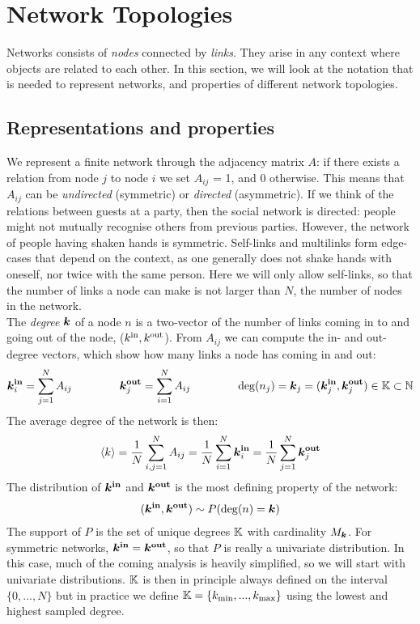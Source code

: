 \newpage
\section{\theory Network Topologies} \label{sec:NetworkTopologies}

Networks consists of \textsl{nodes} connected by \textsl{links}. They arise in any context where objects are related to each other. In this section, we will look at the notation that is needed to represent networks, and properties of different network topologies.

\subsection{Representations and properties}
We represent a finite network through the adjacency matrix $A$: if there exists a relation from node $j$ to node $i$ we set $A_{ij} $ = 1, and 0 otherwise. This means that $A_{ij}$ can be \textsl{undirected} (symmetric) or \textsl{directed} (asymmetric). If we think of the relations between guests at a party, then the social network is directed: people might not mutually recognise others from previous parties. However, the network of people having shaken hands is symmetric. Self-links and multilinks form edge-cases that depend on the context, as one generally does not shake hands with oneself, nor twice with the same person. Here we will only allow self-links, so that the number of links a node can make is not larger than $N$, the number of nodes in the network.\\

The \textsl{degree} ${\boldsymbol{k}}$ of a node $n$  is a two-vector of the number of links coming in to and going out of the node, (${k^{\rm in}}, {k^{\rm out}}$). From $A_{ij}$ we can compute the in- and out-degree vectors, which show how many links a node has coming in and out:
\begin{align}
\kinbi = \sum_{j=1}^{N} A_{i j} \hspace{15mm} \koutbj = \sum_{i=1}^{N} A_{i j}  \hspace{15mm} \degree(n_j) = \k_j = (\boldsymbol{k}_j^{\bf in}, \koutbj) \in \K \subset \mathbb{N} \label{eq:definekinkoutfromA} 
\end{align}
The average degree of the network is then: 
\begin{align}
{\langle k\rangle} = \frac{1}{N} \sum_{i,j=1}^{N} A_{ij} = \frac{1}{N} \sum_{i=1}^{N} {\boldsymbol{k}_i^{\bf in}} = \frac{1}{N} \sum_{j=1}^{N} {\boldsymbol{k}_j^{\bf out}} \label{eq:kmean} 
\end{align}
The distribution of ${\boldsymbol{k^{\rm in}}}$ and $\boldsymbol{{k^{\rm out}}}$ is the most defining property of the network:
\begin{align}
({\boldsymbol{k^{\rm in}}}, \boldsymbol{{k^{\rm out}}}) \sim P({\rm deg}(n) = {\boldsymbol{k}}) \label{eq:definekinkoutfromP} 
\end{align}
The support of $P$ is the set of unique degrees ${\mathbb{K}}$ with cardinality $M_{\boldsymbol{k}}$. For symmetric networks, ${\boldsymbol{k^{\rm in}}} = \boldsymbol{{k^{\rm out}}}$, so that $P$ is really a univariate distribution. In this case, much of the coming analysis is heavily simplified, so we will start with univariate distributions. ${\mathbb{K}}$ is then in principle always defined on the interval $\{0, ... ,N \}$ but in practice we define ${\mathbb{K}} = \{k_{\text{min}}, ... , k_{\text{max}} \}$ using the lowest and highest sampled degree. 

